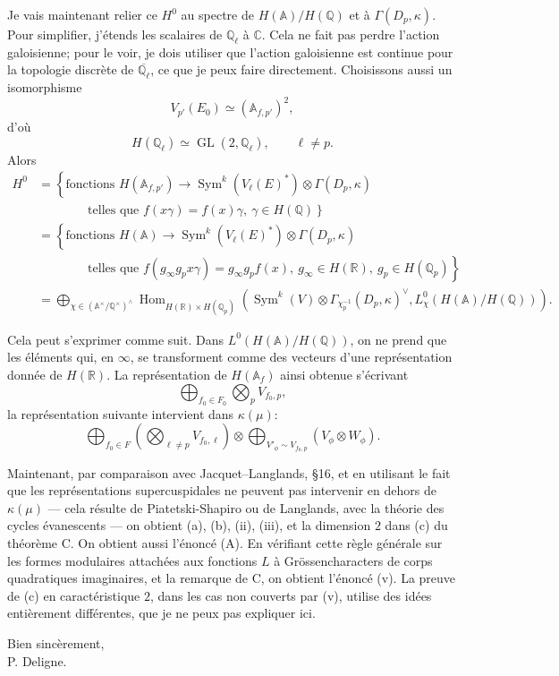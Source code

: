 \documentclass[11pt]{article}
\newcommand{\Q}{\mathbb{Q}}
\newcommand{\C}{\mathbb{C}}
\newcommand{\Qp}{\mathbb{Q}_{p}}
\newcommand{\Ql}{\mathbb{Q}_{\ell}}
\newcommand{\Af}{\mathbb{A}_{f}}
\newcommand{\Afp}{\mathbb{A}_{f,p'}}
\newcommand{\Hom}{\operatorname{Hom}}
\newcommand{\GL}{\operatorname{GL}}
\newcommand{\Sym}{\operatorname{Sym}}
\begin{document}
Je vais maintenant relier ce \(H^0\) au spectre de \(H(\mathbb A)/H(\Q)\) et à \(\Gamma(D_p,\kappa)\). Pour simplifier, j'étends les scalaires de \(\Ql\) à \(\C\). Cela ne fait pas perdre l'action galoisienne; pour le voir, je dois utiliser que l'action galoisienne est continue pour la topologie discrète de \(\overline{\Ql}\), ce que je peux faire directement. Choisissons aussi un isomorphisme
\[
V_{p'}(E_0)\simeq(\Afp)^2,
\]
d'où
\[
H(\Ql)\simeq\GL(2,\Ql),\qquad \ell\neq p.
\]
Alors
\[
\begin{aligned}
H^0
&=\left\{\text{fonctions }H(\Afp)\to
\Sym^k(V_{\ell}(E)^*)\otimes\Gamma(D_p,\kappa)\right.\\
&\hspace{4em}\left.\text{telles que }f(x\gamma)=f(x)\gamma,\ \gamma\in H(\Q)\right\}\\
&=\left\{\text{fonctions }H(\mathbb A)\to
\Sym^k(V_{\ell}(E)^*)\otimes\Gamma(D_p,\kappa)\right.\\
&\hspace{4em}\left.\text{telles que }f(g_{\infty}g_px\gamma)=g_{\infty}g_pf(x),\
g_{\infty}\in H(\mathbb R),\ g_p\in H(\Qp)\right\}\\
&=\bigoplus_{\chi\in(\mathbb A^{\times}/\Q^{\times})^\wedge}
\Hom_{H(\mathbb R)\times H(\Qp)}
\left(
\Sym^k(V)\otimes\Gamma_{\chi_p^{-1}}(D_p,\kappa)^{\vee},
L_{\chi}^{0}(H(\mathbb A)/H(\Q))
\right).
\end{aligned}
\]

Cela peut s'exprimer comme suit. Dans \(L^0(H(\mathbb A)/H(\Q))\), on ne prend que les éléments qui, en \(\infty\), se transforment comme des vecteurs d'une représentation donnée de \(H(\mathbb R)\). La représentation de \(H(\Af)\) ainsi obtenue s'écrivant
\[
\bigoplus_{f_0\in F_0}\bigotimes_p V_{f_0,p},
\]
la représentation suivante intervient dans \(\kappa(\mu)\):
\[
\bigoplus_{f_0\in F}
\left(\bigotimes_{\ell\neq p}V_{f_0,\ell}\right)
\otimes
\bigoplus_{V'_{\phi}\sim V_{f_0,p}}
(V_{\phi}\otimes W_{\phi}).
\]

Maintenant, par comparaison avec Jacquet--Langlands, \S 16, et en utilisant le fait que les représentations supercuspidales ne peuvent pas intervenir en dehors de \(\kappa(\mu)\) — cela résulte de Piatetski-Shapiro ou de Langlands, avec la théorie des cycles évanescents — on obtient (a), (b), (ii), (iii), et la dimension \(2\) dans (c) du théorème C. On obtient aussi l'énoncé (A). En vérifiant cette règle générale sur les formes modulaires attachées aux fonctions \(L\) à Grössencharacters de corps quadratiques imaginaires, et la remarque de C, on obtient l'énoncé (v). La preuve de (c) en caractéristique \(2\), dans les cas non couverts par (v), utilise des idées entièrement différentes, que je ne peux pas expliquer ici.

\begin{flushright}
Bien sincèrement,\\[1.5em]
P. Deligne.
\end{flushright}
\end{document}
